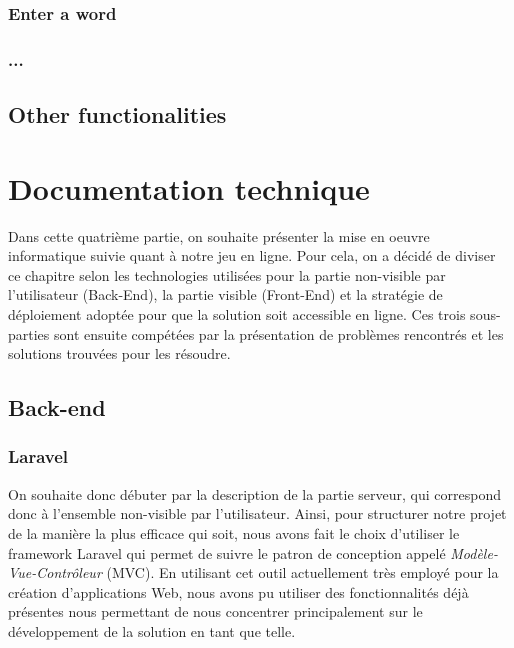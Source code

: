 \documentclass{tnreport}
\begin{document}
\subsection{Enter a word}

\subsection{...}

\section{Other functionalities}

\cleardoublepage

\chapter{Documentation technique}

Dans cette quatrième partie, on souhaite présenter la mise en oeuvre informatique suivie quant à notre jeu en ligne. Pour cela, on a décidé de diviser ce chapitre selon les technologies utilisées pour la partie non-visible par l'utilisateur (Back-End), la partie visible (Front-End) et la stratégie de déploiement adoptée pour que la solution soit accessible en ligne. Ces trois sous-parties sont ensuite compétées par la présentation de problèmes rencontrés et les solutions trouvées pour les résoudre. 

\section{Back-end}

\subsection{Laravel}

On souhaite donc débuter par la description de la partie serveur, qui correspond donc à l'ensemble non-visible par l'utilisateur. Ainsi, pour structurer notre projet de la manière la plus efficace qui soit, nous avons fait le choix d'utiliser le framework Laravel qui permet de suivre le patron de conception appelé \textit{Modèle-Vue-Contrôleur} (MVC). En utilisant cet outil actuellement très employé pour la création d'applications Web, nous avons pu utiliser des fonctionnalités déjà présentes nous permettant de nous concentrer principalement sur le développement de la solution en tant que telle.
\end{document}
